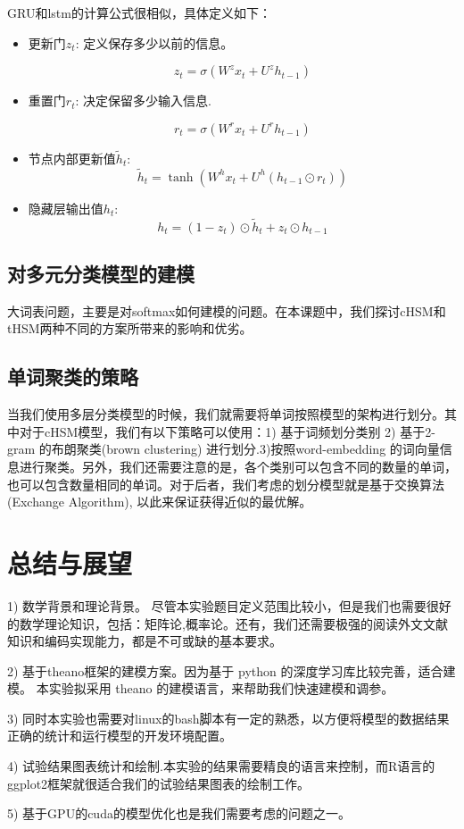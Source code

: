 \documentclass[12pt,a4paper]{article}
\begin{document}
GRU和lstm的计算公式很相似，具体定义如下：
\begin{itemize}
\item 更新门$z_t$: 定义保存多少以前的信息。

\[z_t = \sigma ( W^z x_t+ U^z h_{t-1}  )\]

\item 重置门$r_t$: 决定保留多少输入信息.

\[r_t = \sigma(W^r x_t  + U^r h_{t-1}  )\]

\item 节点内部更新值$\tilde h_t $:
 \[\tilde h_t  = \tanh (W^h x_t  + U^h(h_{t-1} \odot r_t) )\]

\item 隐藏层输出值$h_t$:
\[h_t = (1-z_t)\odot \tilde h_t  + z_t \odot h_{t-1}\]
\end{itemize}

\subsection{对多元分类模型的建模}
大词表问题，主要是对softmax如何建模的问题。在本课题中，我们探讨cHSM和tHSM两种不同的方案所带来的影响和优劣。
\subsection{单词聚类的策略}
当我们使用多层分类模型的时候，我们就需要将单词按照模型的架构进行划分。其中对于cHSM模型，我们有以下策略可以使用：1) 基于词频划分类别 2) 基于2-gram 的布朗聚类(brown clustering) 进行划分.3)按照word-embedding 的词向量信息进行聚类。另外，我们还需要注意的是，各个类别可以包含不同的数量的单词，也可以包含数量相同的单词。对于后者，我们考虑的划分模型就是基于交换算法(Exchange Algorithm), 以此来保证获得近似的最优解。



\section{总结与展望}
1) 数学背景和理论背景。 尽管本实验题目定义范围比较小，但是我们也需要很好的数学理论知识，包括：矩阵论,概率论。还有，我们还需要极强的阅读外文文献知识和编码实现能力，都是不可或缺的基本要求。

2) 基于theano框架的建模方案。因为基于 python 的深度学习库比较完善，适合建模。 本实验拟采用 theano 的建模语言，来帮助我们快速建模和调参。

3) 同时本实验也需要对linux的bash脚本有一定的熟悉，以方便将模型的数据结果正确的统计和运行模型的开发环境配置。

4) 试验结果图表统计和绘制.本实验的结果需要精良的语言来控制，而R语言的ggplot2框架就很适合我们的试验结果图表的绘制工作。

5) 基于GPU的cuda的模型优化也是我们需要考虑的问题之一。
\newpage
{}

\end{document}
